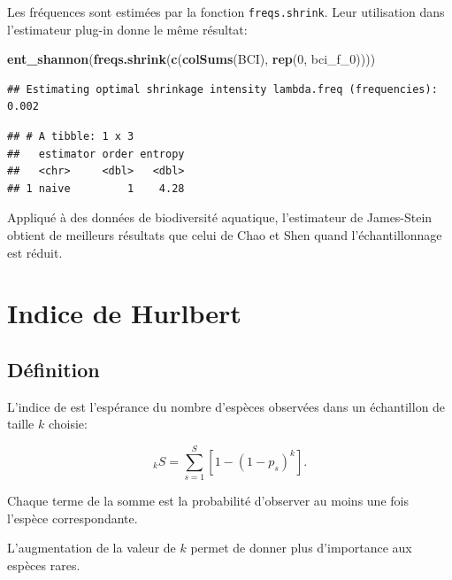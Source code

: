 \documentclass[
  11pt,
  american,
  a4paper,
  extrafontsizes,onecolumn,openright
  ]{memoir}
\newenvironment{Shaded}{\begin{snugshade}}{\end{snugshade}}
\newcommand{\DecValTok}[1]{\textcolor[rgb]{0.00,0.00,0.81}{#1}}
\newcommand{\FunctionTok}[1]{\textcolor[rgb]{0.13,0.29,0.53}{\textbf{#1}}}
\newcommand{\NormalTok}[1]{#1}
\begin{document}
\normalsize

Les fréquences sont estimées par la fonction \texttt{freqs.shrink}.
Leur utilisation dans l'estimateur plug-in donne le même résultat:

\scriptsize

\begin{Shaded}
\begin{Highlighting}[]
\FunctionTok{ent\_shannon}\NormalTok{(}\FunctionTok{freqs.shrink}\NormalTok{(}\FunctionTok{c}\NormalTok{(}\FunctionTok{colSums}\NormalTok{(BCI), }\FunctionTok{rep}\NormalTok{(}\DecValTok{0}\NormalTok{, bci\_f\_0))))}
\end{Highlighting}
\end{Shaded}

\begin{verbatim}
## Estimating optimal shrinkage intensity lambda.freq (frequencies): 0.002
\end{verbatim}

\begin{verbatim}
## # A tibble: 1 x 3
##   estimator order entropy
##   <chr>     <dbl>   <dbl>
## 1 naive         1    4.28
\end{verbatim}

\normalsize

Appliqué à des données de biodiversité aquatique, l'estimateur de James-Stein obtient de meilleurs résultats que celui de Chao et Shen \autocite{Liu2015} quand l'échantillonnage est réduit.

\section{Indice de Hurlbert}\label{sec-Hurlbert}

\subsection{Définition}\label{duxe9finition-2}

L'indice de \textcite{Hurlbert1971} est l'espérance du nombre d'espèces observées dans un échantillon de taille \(k\) choisie:

\begin{equation}
  \label{eq:HurlbertSk}
  _{k}S = \sum^S_{s=1}{\left[ 1 - {\left( 1 - p_s \right)}^k \right]}.
\end{equation}

Chaque terme de la somme est la probabilité d'observer au moins une fois l'espèce correspondante.

L'augmentation de la valeur de \(k\) permet de donner plus d'importance aux espèces rares.
\end{document}

